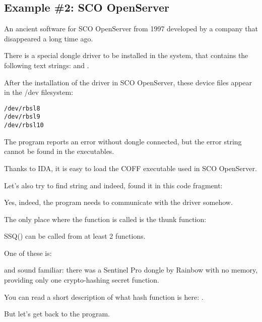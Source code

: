 \subsection{Example \#2: SCO OpenServer}

\label{examples_SCO}
An ancient software for SCO OpenServer from 1997 
developed
by a company that disappeared a long time ago.


There is a special dongle driver to be installed in the system, that contains the following text strings:
and
.

After the installation of the driver in SCO OpenServer, these device files appear in the /dev filesystem:

\begin{lstlisting}
/dev/rbsl8
/dev/rbsl9
/dev/rbsl10
\end{lstlisting}

The program reports an error without dongle connected, but the error string cannot be found in the executables.


Thanks to \ac{IDA}, it is easy to load the COFF executable used in SCO OpenServer.

Let's also try to find  string and indeed, found it in this code fragment:



Yes, indeed, the program needs to communicate with the driver somehow.

The only place where the 
function is called is the \gls{thunk function}:



SSQ() can be called from at least 2 functions.

One of these is:



 and  sound familiar: there was a Sentinel Pro dongle by Rainbow with no memory,
providing only one crypto-hashing secret function.

You can read a short description
of what hash function is here: .

But let's get back to the program.

